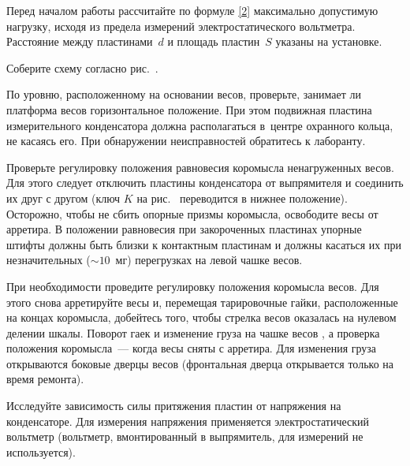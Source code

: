 \begin{lab:task}


		\item Перед началом работы рассчитайте по формуле \eqref{2} максимально
допустимую нагрузку, исходя из предела измерений
		электростатического вольтметра. Расстояние между пластинами~$d$ и
площадь пластин~$S$ указаны на установке.

		\item Соберите схему согласно рис.~.

		По уровню, расположенному на основании весов, проверьте, занимает ли
платформа весов горизонтальное положение. При этом
		подвижная пластина измерительного конденсатора должна располагаться
в~центре охранного кольца, не касаясь его. При
		обнаружении неисправностей обратитесь к лаборанту.

		Проверьте регулировку положения равновесия коромысла ненагруженных
весов. Для этого следует отключить пластины
		конденсатора от выпрямителя и соединить их друг с другом (ключ $K$ на
рис.~ переводится в нижнее положение). Осторожно,
		чтобы не сбить опорные призмы коромысла, освободите весы от арретира. В
положении равновесия при закороченных пластинах
		упорные штифты должны быть близки к контактным пластинам и должны
касаться их при незначительных ($\sim 10$~мг)
		перегрузках на левой чашке весов.

		При необходимости проведите регулировку положения коромысла весов. Для
этого снова арретируйте весы и, перемещая
		тарировочные гайки, расположенные на концах коромысла, добейтесь того,
чтобы стрелка весов оказалась на нулевом делении
		шкалы. Поворот гаек и изменение груза на чашке весов , а проверка
		положения коромысла~--- когда весы сняты с арретира. Для изменения груза
открываются боковые дверцы весов (фронтальная
		дверца открывается только на время ремонта).

		\item Исследуйте зависимость силы притяжения пластин от напряжения на
конденсаторе. Для измерения напряжения применяется
		электростатический вольтметр (вольтметр, вмонтированный в выпрямитель,
для измерений не используется).


\end{lab:task}
